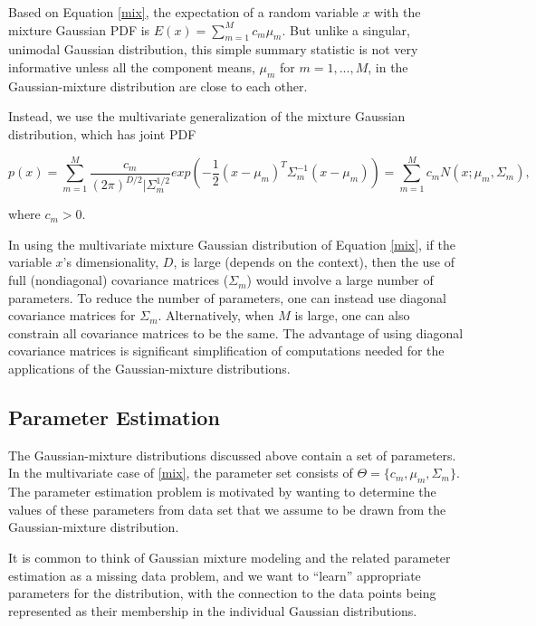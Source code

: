 \documentclass[12pt]{article}
\begin{document}
Based on Equation \ref{mix}, the expectation of a random variable \(x\)
with the mixture Gaussian PDF is \(E(x) = \sum_{m=1}^M c_m \mu_m\). But
unlike a singular, unimodal Gaussian distribution, this simple summary
statistic is not very informative unless all the component means,
\(\mu_m\) for \(m = 1, ..., M\), in the Gaussian-mixture distribution
are close to each other.

Instead, we use the multivariate generalization of the mixture Gaussian
distribution, which has joint PDF

\begin{equation}
\label{joint}
p(x) = \sum_{m=1}^M \frac{c_m}{(2\pi)^{D/2} |\Sigma_m^{1/2}} exp(-\frac{1}{2}(x-\mu_m)^T \Sigma_m^{-1}(x-\mu_m)) = \sum_{m=1}^M c_m N(x; \mu_m, \Sigma_m),
\end{equation}

where \(c_m > 0\).

In using the multivariate mixture Gaussian distribution of Equation
\ref{mix}, if the variable \(x\)'s dimensionality, \(D\), is large
(depends on the context), then the use of full (nondiagonal) covariance
matrices (\(\Sigma_m\)) would involve a large number of parameters. To
reduce the number of parameters, one can instead use diagonal covariance
matrices for \(\Sigma_m\). Alternatively, when \(M\) is large, one can
also constrain all covariance matrices to be the same. The advantage of
using diagonal covariance matrices is significant simplification of
computations needed for the applications of the Gaussian-mixture
distributions.

\hypertarget{parameter-estimation}{%
\subsection{Parameter Estimation}\label{parameter-estimation}}

The Gaussian-mixture distributions discussed above contain a set of
parameters. In the multivariate case of \ref{mix}, the parameter set
consists of \(\Theta = \{c_m, \mu_m, \Sigma_m\}\). The parameter
estimation problem is motivated by wanting to determine the values of
these parameters from data set that we assume to be drawn from the
Gaussian-mixture distribution.

It is common to think of Gaussian mixture modeling and the related
parameter estimation as a missing data problem, and we want to ``learn''
appropriate parameters for the distribution, with the connection to the
data points being represented as their membership in the individual
Gaussian distributions.
\end{document}
